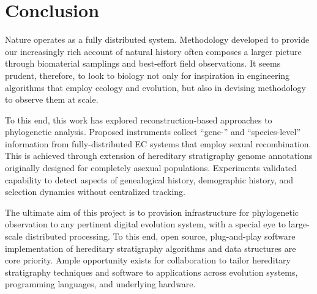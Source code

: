 \section{Conclusion} \label{sec:conclusion}

Nature operates as a fully distributed system.
Methodology developed to provide our increasingly rich account of natural history often composes a larger picture through biomaterial samplings and best-effort field observations.
It seems prudent, therefore, to look to biology not only for inspiration in engineering algorithms that employ ecology and evolution, but also in devising methodology to observe them at scale.

To this end, this work has explored reconstruction-based approaches to phylogenetic analysis.
Proposed instruments collect ``gene-'' and ``species-level'' information from fully-distributed EC systems that employ sexual recombination.
This is achieved through extension of hereditary stratigraphy genome annotations originally designed for completely asexual populations.
Experiments validated capability to detect aspects of genealogical history, demographic history, and selection dynamics without centralized tracking.

The ultimate aim of this project is to provision infrastructure for phylogenetic observation to any pertinent digital evolution system, with a special eye to large-scale distributed processing.
To this end, open source, plug-and-play software implementation of hereditary stratigraphy algorithms and data structures are core priority.
Ample opportunity exists for collaboration to tailor hereditary stratigraphy techniques and software to applications across evolution systems, programming languages, and underlying hardware.
